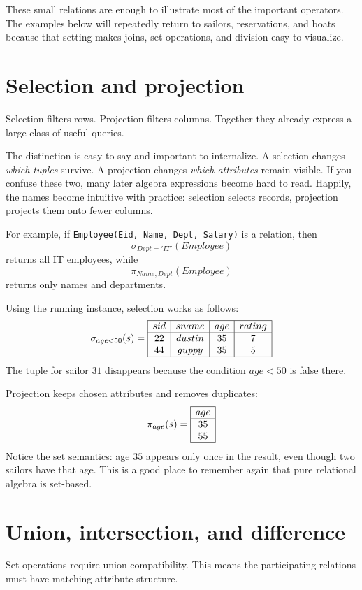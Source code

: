 \documentclass[11pt,a4paper,openany]{book}
\newcommand{\RAselect}{\sigma}
\newcommand{\RAproject}{\pi}
\begin{document}
These small relations are enough to illustrate most of the important operators. The examples below will repeatedly return to sailors, reservations, and boats because that setting makes joins, set operations, and division easy to visualize.

\section{Selection and projection}
Selection filters rows. Projection filters columns. Together they already express a large class of useful queries.

The distinction is easy to say and important to internalize. A selection changes \emph{which tuples} survive. A projection changes \emph{which attributes} remain visible. If you confuse these two, many later algebra expressions become hard to read. Happily, the names become intuitive with practice: selection selects records, projection projects them onto fewer columns.

For example, if \texttt{Employee(Eid, Name, Dept, Salary)} is a relation, then
\[
\RAselect_{Dept='IT'}(Employee)
\]
returns all IT employees, while
\[
\RAproject_{Name,Dept}(Employee)
\]
returns only names and departments.

Using the running instance, selection works as follows:
\[
\RAselect_{age<50}(s)=
\begin{array}{|c|c|c|c|}\hline
sid&sname&age&rating\\\hline
22&dustin&35&7\\
44&guppy&35&5\\\hline
\end{array}
\]
The tuple for sailor \(31\) disappears because the condition \(age<50\) is false there.

Projection keeps chosen attributes and removes duplicates:
\[
\RAproject_{age}(s)=
\begin{array}{|c|}\hline
age\\\hline
35\\
55\\\hline
\end{array}
\]
Notice the set semantics: age \(35\) appears only once in the result, even though two sailors have that age. This is a good place to remember again that pure relational algebra is set-based.

\section{Union, intersection, and difference}
Set operations require union compatibility. This means the participating relations must have matching attribute structure.
\end{document}

